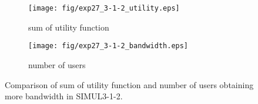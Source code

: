 \begin{figure}
	\begin{center}
		\begin{subfigure}[b]{0.8\textwidth}
			\centering
			\texttt{[image: fig/exp27\_3-1-2\_utility.eps]}
			\caption{sum of utility function}
			\label{figure:simul3_1_2_u_a}
		\end{subfigure}
		\begin{subfigure}[b]{0.8\textwidth}
			\centering
			\texttt{[image: fig/exp27\_3-1-2\_bandwidth.eps]}
			\caption{number of users}
			\label{figure:simul3_1_2_u_b}
		\end{subfigure}
		\caption{Comparison of sum of utility function and number of users obtaining more bandwidth in SIMUL3-1-2.}
		\label{figure:simul3_1_2_u}
	\end{center}
\end{figure}

\clearpage

